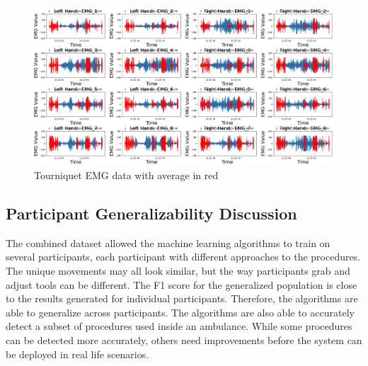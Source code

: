 \begin{figure}[!h]
	\centering
	\includegraphics[width=0.7\linewidth]{pictures/5187_EMG_Day3_t_1_average}
	\caption{Tourniquet EMG data with average in red}
	\label{fig:5187emgday3t1average}
\end{figure}

\subsection{Participant Generalizability Discussion}
\label{sec:Results:Generalizability:Discussion}

The combined dataset allowed the machine learning algorithms to train on several participants, each participant with different approaches to the procedures. The unique movements may all look similar, but the way participants grab and adjust tools can be different. 
The F1 score for the generalized population is close to the results generated for individual participants. Therefore, the algorithms are able to generalize across participants. The algorithms are also able to accurately detect a subset of procedures used inside an ambulance. While some procedures can be detected more accurately, others need improvements before the system can be deployed in real life scenarios.


